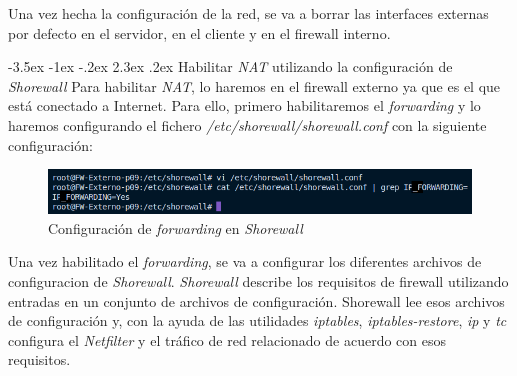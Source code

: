 \documentclass[11pt]{report}
\makeatletter
\renewcommand\chapter{\@startsection{chapter}{0}{\z@}%
    {-3.5ex \@plus -1ex \@minus -.2ex}%
    {2.3ex \@plus.2ex}%
    {\normalfont\Large\bfseries}}
\makeatother
\begin{document}
Una vez hecha la configuración de la red, se va a borrar las interfaces externas por defecto
en el servidor, en el cliente y en el firewall interno.

\cleardoublepage

\chapter{Habilitar \emph{NAT} utilizando la configuración de \emph{Shorewall}}
Para habilitar \emph{NAT}, lo haremos en el firewall externo ya que es el que está conectado 
a Internet. Para ello, primero habilitaremos el \emph{forwarding} y lo haremos configurando el
fichero \emph{/etc/shorewall/shorewall.conf} con la siguiente configuración:
\begin{figure}[H]
  \centering
  \includegraphics[scale=0.7]{img/forwarding_shorewall.png}
  \caption{Configuración de \emph{forwarding} en \emph{Shorewall}}
  \label{fig:Configuracion de forwarding en Shorewall}
\end{figure}

Una vez habilitado el \emph{forwarding}, se va a configurar los diferentes archivos de configuracion
de \emph{Shorewall}. \emph{Shorewall} describe los requisitos de firewall utilizando entradas en un 
conjunto de archivos de configuración. Shorewall lee esos archivos de configuración y, 
con la ayuda de las utilidades \emph{iptables}, \emph{iptables-restore}, \emph{ip} y \emph{tc} configura 
el \emph{Netfilter} y el tráfico de red relacionado de acuerdo con esos requisitos.
\end{document}
